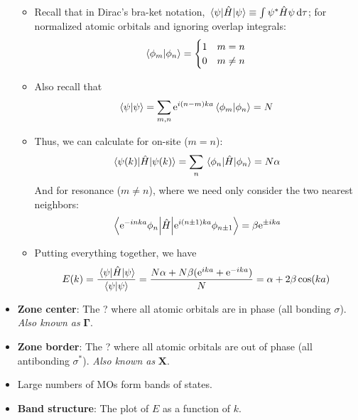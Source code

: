 \documentclass[../notes.tex]{subfiles}
\begin{document}
\begin{itemize}
\begin{itemize}
\begin{equation*}
        \end{equation*}
        \item Recall that in Dirac's bra-ket notation, $\ev{\hat{H}}{\psi}\equiv\int\psi^*\hat{H}\psi\dd{\tau}$; for normalized atomic orbitals and ignoring overlap integrals:
        \begin{equation*}
            \braket{\phi_m}{\phi_n} =
            \begin{cases}
                1 & m=n\\
                0 & m\neq n
            \end{cases}
        \end{equation*}
        \item Also recall that
        \begin{equation*}
            \braket{\psi} = \sum_{m,n}\e[i(n-m)ka]\braket{\phi_m}{\phi_n} = N
        \end{equation*}
        \item Thus, we can calculate for on-site ($m=n$):
        \begin{equation*}
            \ev{\hat{H}}{\psi(k)} = \sum_n\ev{\hat{H}}{\phi_n} = N\alpha
        \end{equation*}
        And for resonance ($m\neq n$), where we need only consider the two nearest neighbors:
        \begin{equation*}
            \mel{\e[-inka]\phi_n}{\hat{H}}{\e[i(n\pm 1)ka]\phi_{n\pm 1}} = \beta\e[\pm ika]
        \end{equation*}
        \item Putting everything together, we have
        \begin{equation*}
            E(k) = \frac{\ev{\hat{H}}{\psi}}{\braket{\psi}} = \frac{N\alpha+N\beta(\e[ika]+\e[-ika])}{N} = \alpha+2\beta\cos(ka)
        \end{equation*}
    \end{itemize}
    \item \textbf{Zone center}: The ? where all atomic orbitals are in phase (all bonding $\sigma$). \emph{Also known as} $\bm{\Gamma}$.
    \item \textbf{Zone border}: The ? where all atomic orbitals are out of phase (all antibonding $\sigma^*$). \emph{Also known as} $\bm{X}$.
    \item Large numbers of MOs form bands of states.
    \item \textbf{Band structure}: The plot of $E$ as a function of $k$.
    \begin{itemize}

\end{itemize}
\end{itemize}
\end{document}
